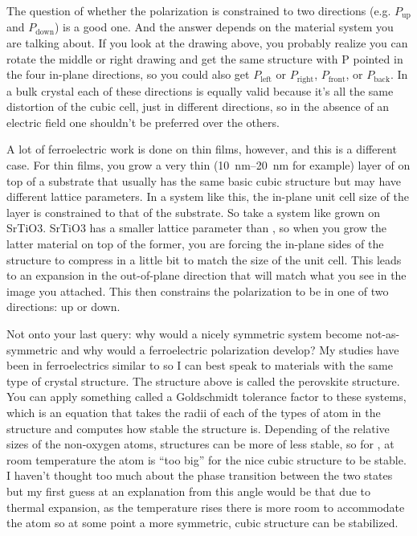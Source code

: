 \begin{changemargin}{2.5cm}{2.5cm}
The question of whether the polarization is constrained to two directions (e.g. $P_{\text{up}}$ and $P_{\text{down}}$) is a good one. And the answer depends on the material system you are talking about. If you look at the drawing above, you probably realize you can rotate the middle or right drawing and get the same structure with P pointed in the four in-plane directions, so you could also get $P_{\text{left}}$ or $P_{\text{right}}$, $P_{\text{front}}$, or $P_{\text{back}}$. In a bulk crystal each of these directions is equally valid because it's all the same distortion of the cubic cell, just in different directions, so in the absence of an electric field one shouldn't be preferred over the others.

A lot of ferroelectric work is done on thin films, however, and this is a different case. For thin films, you grow a very thin (\SIrange{10}{20}{\nano\meter} for example) layer of  on top of a substrate that usually has the same basic cubic structure but may have different lattice parameters. In a system like this, the in-plane unit cell size of the  layer is constrained to that of the substrate. So take a system like  grown on SrTiO3. SrTiO3 has a smaller lattice parameter than , so when you grow the latter material on top of the former, you are forcing the in-plane sides of the  structure to compress in a little bit to match the size of the  unit cell. This leads to an expansion in the out-of-plane direction that will match what you see in the image you attached. This then constrains the polarization to be in one of two directions: up or down.

Not onto your last query: why would a nicely symmetric system become not-as-symmetric and why would a ferroelectric polarization develop? My studies have been in ferroelectrics similar to  so I can best speak to materials with the same type of crystal structure. The structure above is called the perovskite structure. You can apply something called a Goldschmidt tolerance factor to these systems, which is an equation that takes the radii of each of the types of atom in the structure and computes how stable the structure is. Depending of the relative sizes of the non-oxygen atoms, structures can be more of less stable, so for , at room temperature the  atom is ``too big'' for the nice cubic structure to be stable. I haven't thought too much about the phase transition between the two states but my first guess at an explanation from this angle would be that due to thermal expansion, as the temperature rises there is more room to accommodate the  atom so at some point a more symmetric, cubic structure can be stabilized.


\end{changemargin}
